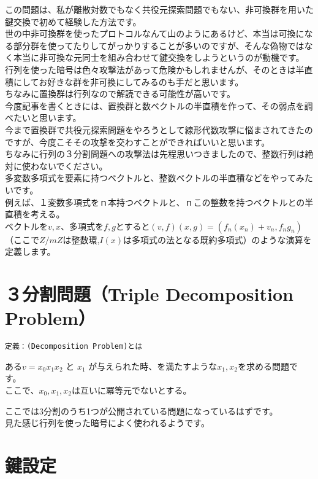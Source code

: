 \documentclass[
]{article}
\begin{document}
この問題は、私が離散対数でもなく共役元探索問題でもない、非可換群を用いた鍵交換で初めて経験した方法です。\\
世の中非可換群を使ったプロトコルなんて山のようにあるけど、本当は可換になる部分群を使ってたりしてがっかりすることが多いのですが、そんな偽物ではなく本当に非可換な元同士を組み合わせて鍵交換をしようというのが動機です。\\
行列を使った暗号は色々攻撃法があって危険かもしれませんが、そのときは半直積にしてお好きな群を非可換にしてみるのも手だと思います。\\
ちなみに置換群は行列なので解読できる可能性が高いです。\\
今度記事を書くときには、置換群と数ベクトルの半直積を作って、その弱点を調べたいと思います。\\
今まで置換群で共役元探索問題をやろうとして線形代数攻撃に悩まされてきたのですが、今度こそその攻撃を交わすことができればいいと思います。\\
ちなみに行列の３分割問題への攻撃法は先程思いつきましたので、整数行列は絶対に使わないでください。\\
多変数多項式を要素に持つベクトルと、整数ベクトルの半直積などをやってみたいです。\\
例えば、１変数多項式をｎ本持つベクトルと、ｎこの整数を持つベクトルとの半直積を考える。\\
ベクトルを\(v,x\)、多項式を\(f,g\)とすると\((v,f)(x,g)=(f_n(x_n)+v_n,f_ng_n)\)（ここで\(Z/mZ\)は整数環,\(I(x)\)は多項式の法となる既約多項式）のような演算を定義します。

\hypertarget{ux5206ux5272ux554fux984ctriple-decomposition-problem}{%
\section{３分割問題（Triple Decomposition
Problem）}\label{ux5206ux5272ux554fux984ctriple-decomposition-problem}}

\begin{verbatim}
定義：(Decomposition Problem)とは  
\end{verbatim}

ある\(v = x_0x_1x_2\) と \(x_1\)
が与えられた時、を満たすような\(x_1,x_2\)を求める問題です。\\
ここで、\(x_0,x_1,x_2\)は互いに冪等元でないとする。

ここでは3分割のうち1つが公開されている問題になっているはずです。\\
見た感じ行列を使った暗号によく使われるようです。

\hypertarget{ux9375ux8a2dux5b9a}{%
\section{鍵設定}\label{ux9375ux8a2dux5b9a}}
\end{document}
